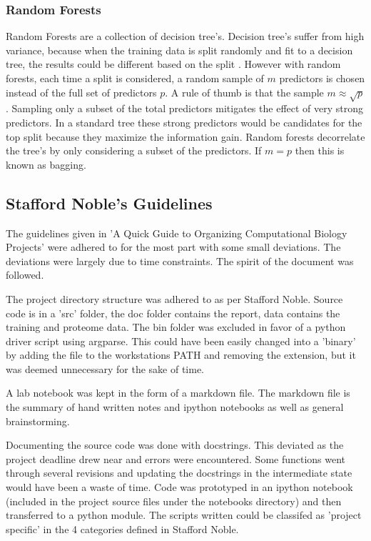 \documentclass[10pt,letterpaper]{article}
\begin{document}
	\subsubsection*{Random Forests}
	Random Forests are a collection of decision tree's. Decision tree's suffer from high variance, because when the training data is split randomly and fit to a decision tree, the results could be different based on the split \cite{yellowbook}. However with random forests, each time a split is considered, a random sample of $m$ predictors is chosen instead of the full set of predictors $p$. A rule of thumb is that the sample $m \approx \sqrt{p}$ \cite{yellowbook}. Sampling only a subset of the total predictors mitigates the effect of very strong predictors. In a standard tree these strong predictors would be candidates for the top split because they maximize the information gain. Random forests decorrelate the tree's by only considering a subset of the predictors. If $m=p$ then this is known as bagging.
	
	\subsection*{Stafford Noble's Guidelines}
	The guidelines given in 'A Quick Guide to Organizing Computational Biology Projects' \cite{noble} were adhered to for the most part with some small deviations. The deviations were largely due to time constraints. The spirit of the document was followed.
	
	The project directory structure was adhered to as per Stafford Noble. Source code is in a 'src' folder, the doc folder contains the report, data contains the training and proteome data. The bin folder was excluded in favor of a python driver script using argparse. This could have been easily changed into a 'binary' by adding the file to the workstations PATH and removing the extension, but it was deemed unnecessary for the sake of time. 
	
	A lab notebook was kept in the form of a markdown file. The markdown file is the summary of hand written notes and ipython notebooks as well as general brainstorming. 
	
	Documenting the source code was done with docstrings. This deviated as the project deadline drew near and errors were encountered. Some functions went through several revisions and updating the docstrings in the intermediate state would have been a waste of time. Code was prototyped in an ipython notebook (included in the project source files under the notebooks directory) and then transferred to a python module. The scripts written could be classifed as 'project specific' in the 4 categories defined in Stafford Noble. 
	
\end{document}
